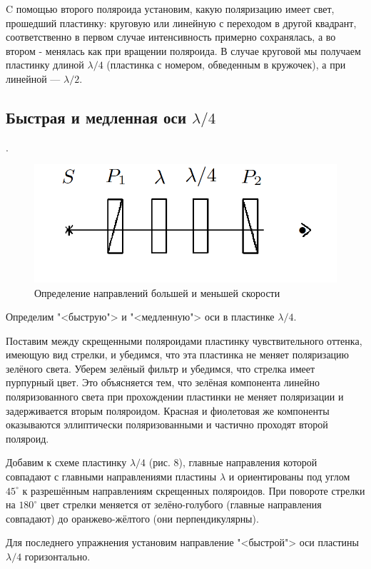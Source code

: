 \documentclass[a4paper, 12pt]{article}
\begin{document}
C помощью второго поляроида установим, какую поляризацию
имеет свет, прошедший пластинку: круговую или линейную с переходом
в другой квадрант, соответственно в первом случае интенсивность примерно сохранялась, а во втором - менялась как при вращении поляроида. В случае круговой мы получаем пластинку длиной $ \lambda/4 $ (пластинка с номером, обведенным в кружочек), а при линейной --- $ \lambda/2 $.

\subsection{Быстрая и медленная оси $ \lambda/4 $}.

\begin{figure}
	\includegraphics[width=\linewidth]{8}
	\caption{Определение направлений
большей и меньшей скорости}
	\label{ris 8}
\end{figure}

Определим "<быструю"> и "<медленную"> оси в пластинке $ \lambda/4 $.

Поставим между скрещенными поляроидами пластинку чувствительного оттенка, имеющую вид стрелки, и убедимся, что эта пластинка не меняет поляризацию зелёного света. Уберем зелёный фильтр и убедимся, что стрелка имеет пурпурный цвет. Это объясняется тем, что зелёная компонента линейно поляризованного света при прохождении пластинки не меняет поляризации и задерживается вторым поляроидом. Красная и фиолетовая же компоненты оказываются эллиптически поляризованными и частично проходят второй поляроид.

Добавим к схеме пластинку $ \lambda/4 $
(рис. 8), главные направления которой совпадают с главными направлениями пластины $ \lambda $ и ориентированы под углом $ 45^\circ $ к разрешённым направлениям скрещенных поляроидов.
При повороте стрелки на $ 180^\circ $ 
цвет стрелки меняется от зелёно-голубого (главные направления совпадают) до оранжево-жёлтого (они перпендикулярны).

Для последнего упражнения установим направление "<быстрой"> оси пластины $ \lambda/4 $ горизонтально.
\end{document}
